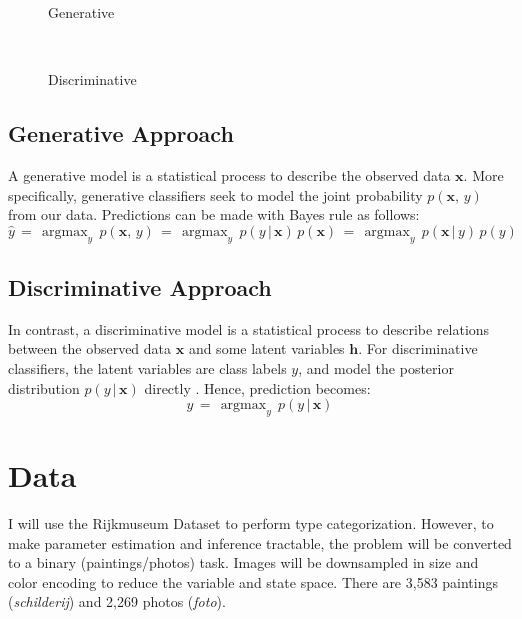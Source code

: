 \documentclass{article}
\DeclareMathOperator*{\argmax}{argmax}
\begin{document}
\begin{figure*}[h!]
    \centering
    \begin{subfigure}[t]{0.15\textwidth}
        \centering
        \caption*{Generative}
    \end{subfigure}%
    ~
    \begin{subfigure}[t]{0.15\textwidth}
        \centering
        \caption*{Discriminative}
    \end{subfigure}
\end{figure*}

\subsection{Generative Approach}
A generative model is a statistical process to describe the observed data
$\mathbf{x}$. More specifically, generative classifiers seek to
model the joint probability $p(\mathbf{x},\, y)$ from our data\cite{NgJordan}.
Predictions can be made with Bayes rule as follows:
\begin{equation}
  \hat{y} \,=\, \argmax_y \, p(\mathbf{x}, \,y) \,=\, \argmax_y \, p(y \,|\, \mathbf{x}) \, p(\mathbf{x}) \,=\, \argmax_y \, p(\mathbf{x} \,|\, y) \, p(y)
\end{equation}

\subsection{Discriminative Approach}
In contrast, a discriminative model is a statistical process to describe
relations between the observed data $\mathbf{x}$ and some latent variables
$\mathbf{h}$. For discriminative classifiers, the latent variables are class
labels $y$, and model the posterior distribution $p(y\,|\,\mathbf{x})$
directly \cite{NgJordan}. Hence, prediction becomes:
\begin{equation}
  \hat{y} \,=\, \argmax_y \, p(y \,|\, \mathbf{x})
\end{equation}

\section{Data}
I will use the Rijkmuseum Dataset \cite{Rijksmuseum} to perform type categorization.
However, to make parameter estimation and inference tractable,
the problem will be converted to a binary (paintings/photos) task. Images
will be downsampled in size and color encoding to reduce the variable and
state space. There are 3,583 paintings (\textit{schilderij}) and 2,269 photos
(\textit{foto}).
\end{document}
